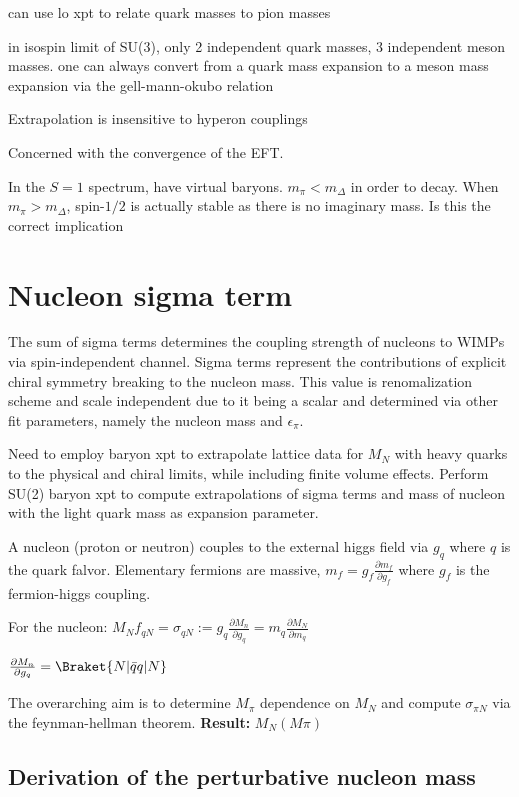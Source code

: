\documentclass[12pt,tightenlines, raggedbottom, prd, notitlepage]{revtex4-1}
\begin{document}
can use lo xpt to relate quark masses to pion masses  

in isospin limit of SU(3), only 2 independent quark masses, 3 independent meson masses.
one can always convert from a quark mass expansion to a meson mass expansion via the gell-mann-okubo relation

Extrapolation is insensitive to hyperon couplings

Concerned with the convergence of the EFT. 

In the $S=1$ spectrum, have virtual baryons. 
$m_\pi < m_\Delta$ in order to decay. 
When $m_\pi > m_\Delta$, spin-$1/2$ is actually stable as there is no imaginary mass. Is this the correct implication

\section*{Nucleon sigma term}

The sum of sigma terms determines the coupling strength of nucleons to WIMPs via spin-independent channel. 
Sigma terms represent the contributions of explicit chiral symmetry breaking to the nucleon mass. This value is renomalization
scheme and scale independent due to it being a scalar and determined via other fit parameters, namely the nucleon mass 
and $\epsilon_\pi$.  

Need to employ baryon xpt to extrapolate lattice data for $M_N$ with heavy quarks to the physical
and chiral limits, while including finite volume effects. Perform SU(2) baryon xpt to compute 
extrapolations of sigma terms and mass of nucleon with the light quark mass as expansion parameter. 


A nucleon (proton or neutron) couples to the external higgs field via $g_q$ where $q$
is the quark falvor. Elementary fermions are massive, $m_f = g_f\frac{\partial m_f}{\partial g_f}$ where 
$g_f$ is the fermion-higgs coupling. 

For the nucleon: $M_Nf_{qN} = \sigma_{qN} := g_q\frac{\partial M_n}{\partial g_q} = m_q\frac{\partial M_N}{\partial m_q}$

$ \frac{\partial M_n}{\partial g_q} = \Braket{N | \bar{q}q | N}$

The overarching aim is to determine $M_\pi$ dependence on $M_N$ and compute $\sigma_{\pi N}$ 
via the feynman-hellman theorem. 
\textbf{Result:} $M_N(M\pi)$

\subsection*{Derivation of the perturbative nucleon mass}
\end{document}
